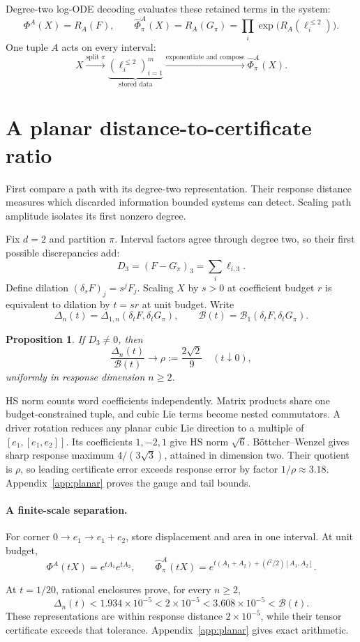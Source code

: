 \documentclass[11pt,a4paper]{article}
\newtheorem{proposition}{Proposition}
\newcommand{\B}{\mathcal B}
\newcommand{\Del}{\Delta}
\begin{document}
Degree-two log-ODE decoding evaluates these retained terms in the system:
\[
 \Phi^A(X)=R_A(F),\qquad
 \widehat\Phi^A_\pi(X)=R_A(G_\pi)
 =\prod_i\exp\bigl(R_A(\ell_i^{\le2})\bigr).
\]
One tuple \(A\) acts on every interval:
\[
 X\xrightarrow{\text{split }\pi}
 \underbrace{(\ell_i^{\le2})_{i=1}^m}_{\text{stored data}}
 \xrightarrow{\text{exponentiate and compose}}\widehat\Phi^A_\pi(X).
\]

\section{A planar distance-to-certificate ratio}
First compare a path with its degree-two representation. Their response
distance measures which discarded information bounded systems can detect.
Scaling path amplitude isolates its first nonzero degree.

Fix \(d=2\) and partition \(\pi\). Interval factors agree through degree two,
so their first possible discrepancies add:
\[
 D_3=(F-G_\pi)_3=\sum_i\ell_{i,3}.
\]
Define dilation \((\delta_sF)_j=s^jF_j\). Scaling \(X\) by \(s>0\) at
coefficient budget \(r\) is equivalent to dilation by \(t=sr\) at unit budget.
Write
\[
 \Del_n(t)=\Del_{1,n}(\delta_tF,\delta_tG_\pi),\qquad
 \B(t)=\B_1(\delta_tF,\delta_tG_\pi).
\]

\begin{proposition}\label{prop:bv}
If \(D_3\ne0\), then
\[
 \frac{\Del_n(t)}{\B(t)}\longrightarrow
 \rho:=\frac{2\sqrt2}{9}\quad(t\downarrow0),
\]
uniformly in response dimension \(n\ge2\).
\end{proposition}

HS norm counts word coefficients independently. Matrix products share one
budget-constrained tuple, and cubic Lie terms become nested commutators.
A driver rotation reduces any planar cubic Lie direction to a multiple of
\([e_1,[e_1,e_2]]\). Its coefficients \(1,-2,1\) give HS norm \(\sqrt6\).
B\"ottcher--Wenzel \cite{bottcher2008frobenius} gives sharp response maximum
\(4/(3\sqrt3)\), attained in dimension two. Their quotient is \(\rho\),
so leading certificate error exceeds response error by factor
\(1/\rho\approx3.18\). Appendix~\ref{app:planar} proves the gauge and tail bounds.

\paragraph{A finite-scale separation.}
For corner \(0\to e_1\to e_1+e_2\), store displacement and area in one
interval. At unit budget,
\[
 \Phi^A(tX)=e^{tA_1}e^{tA_2},\qquad
 \widehat\Phi^A_\pi(tX)=e^{t(A_1+A_2)+(t^2/2)[A_1,A_2]}.
\]
\begin{samepage}
At \(t=1/20\), rational enclosures prove, for every \(n\ge2\),
\begin{equation}\label{eq:corner}
 \Del_n(t)<1.934\times10^{-5}<2\times10^{-5}<3.608\times10^{-5}<\B(t).
\end{equation}
These representations are within response distance \(2\times10^{-5}\),
while their tensor certificate exceeds that tolerance.
Appendix~\ref{app:planar} gives exact arithmetic.
\par
\end{samepage}
\end{document}
